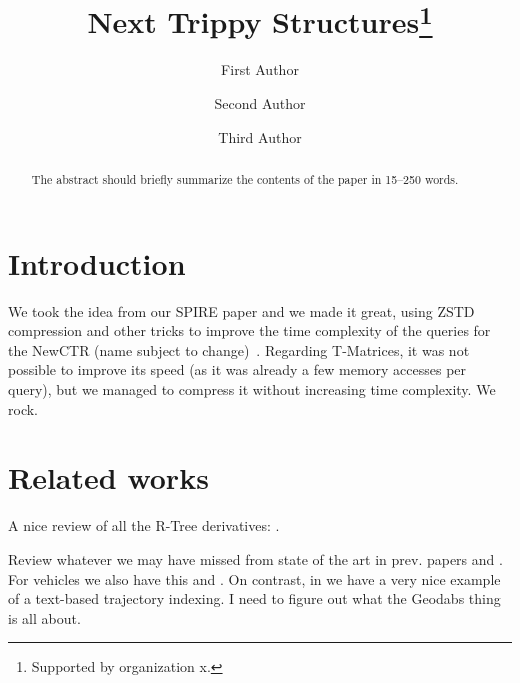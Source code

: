 \documentclass[runningheads]{llncs}
\newcommand{\acumm}{T-Matrices} %
\newcommand{\ctr}{NewCTR (name subject to change)\ }
\begin{document}
%
\title{Next Trippy Structures\thanks{Supported by organization x.}}
%
%
\author{First Author \and
Second Author \and
Third Author}
%
%
%
\maketitle              %
%
\begin{abstract}
The abstract should briefly summarize the contents of the paper in
15--250 words.

\end{abstract}
%
%
%
\section{Introduction}
We took the idea from our SPIRE paper and we made it great, using ZSTD compression and other tricks to improve the time complexity of the queries for the \ctr. Regarding \acumm, it was not possible to improve its speed (as it was already a few memory accesses per query), but we managed to compress it without increasing time complexity. We rock.

\section{Related works}
A nice review of all the R-Tree derivatives: \cite{john2017performance}.

Review whatever we may have missed from state of the art in prev. papers \cite{koide2018cinct} and \cite{ding2018ultraman}. For vehicles we also have this \cite{cai2018vector} and \cite{lovell2018lossless}. On contrast, in \cite{al2017semantictraj} we have a very nice example of a text-based trajectory indexing. I need to figure out what the Geodabs thing \cite{chapuis2018geodabs} is all about.
\end{document}
